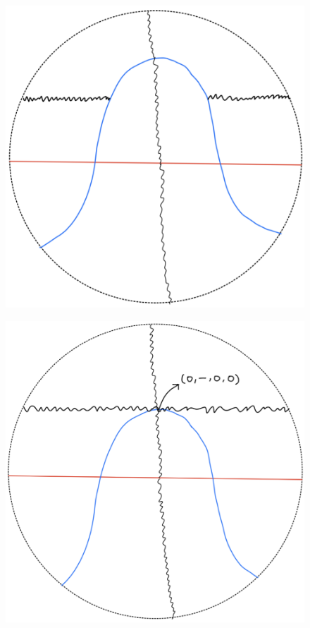 \begin{definition}
\begin{enumerate}
\begin{itemize}
\begin{figure}[H]
    \centering
    \includegraphics[scale = 0.45]{diagrams/cobord'2/22.png} 
    \caption{}
    \label{fig:your-label}
\end{figure}
\begin{figure}[H]
    \centering
    \includegraphics[scale = 0.45]{diagrams/cobord'2/23.png} 

\end{figure}
\end{itemize}
\end{enumerate}
\end{definition}
